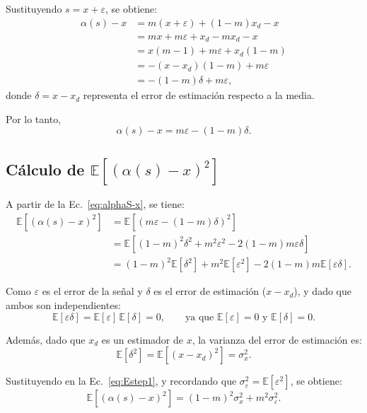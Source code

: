 Sustituyendo $s = x + \varepsilon$, se obtiene:
\begin{align*}
\alpha(s) - x 
&= m(x + \varepsilon) + (1 - m)x_d - x \\
&= mx + m\varepsilon + x_d - mx_d - x \\
&= x(m - 1) + m\varepsilon + x_d(1 - m) \\
&= -(x - x_d)(1 - m) + m\varepsilon \\
&= -(1 - m)\delta + m\varepsilon,
\end{align*}
donde $\delta = x - x_d$ representa el error de estimación respecto a la media.

Por lo tanto,
\begin{equation}
\alpha(s) - x = m\varepsilon - (1 - m)\delta.
\label{eq:alphaS-x}
\end{equation}

\subsection{Cálculo de $\mathbb{E}[(\alpha(s) - x)^2]$}

A partir de la Ec.~\eqref{eq:alphaS-x}, se tiene:
\begin{align}
\mathbb{E}[(\alpha(s) - x)^2] 
&= \mathbb{E}\!\left[ (m\varepsilon - (1 - m)\delta)^2 \right] \nonumber \\
&= \mathbb{E}[(1 - m)^2 \delta^2 + m^2 \varepsilon^2 - 2(1 - m)m \varepsilon \delta] \nonumber \\
&= (1 - m)^2 \mathbb{E}[\delta^2] + m^2 \mathbb{E}[\varepsilon^2] - 2(1 - m)m \mathbb{E}[\varepsilon \delta].
\label{eq:Estep1}
\end{align}

Como $\varepsilon$ es el error de la señal y $\delta$ es el error de estimación ($x - x_d$), y dado que ambos son independientes:
\begin{equation}
\mathbb{E}[\varepsilon \delta] = \mathbb{E}[\varepsilon]\, \mathbb{E}[\delta] = 0,
\qquad
\text{ya que } \mathbb{E}[\varepsilon] = 0 \text{ y } \mathbb{E}[\delta] = 0.
\label{eq:Eepsilondelta}
\end{equation}

Además, dado que $x_d$ es un estimador de $x$, la varianza del error de estimación es:
\begin{equation}
\mathbb{E}[\delta^2] = \mathbb{E}[(x - x_d)^2] = \sigma_x^2.
\end{equation}

Sustituyendo en la Ec.~\eqref{eq:Estep1}, y recordando que $\sigma_{\varepsilon}^2 = \mathbb{E}[\varepsilon^2]$, se obtiene:
\begin{equation}
\mathbb{E}[(\alpha(s) - x)^2] = (1 - m)^2 \sigma_x^2 + m^2 \sigma_{\varepsilon}^2.
\label{eq:Estep2}
\end{equation}

